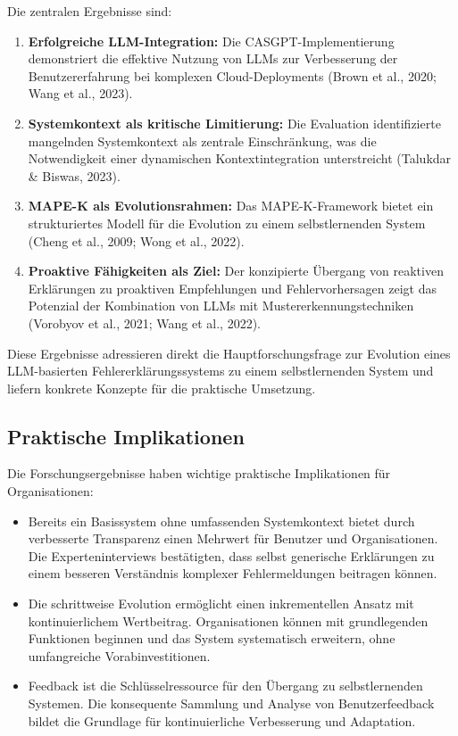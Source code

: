 \documentclass[
  a4paper,
  12pt,
  oneside,
  open=any,
  BCOR=12mm,
  DIV=14,
  parskip=half*,
  headsepline,
  footsepline,
  pointlessnumbers,
  liststotoc,
  numbers=noenddot,
  listof=totoc]{scrartcl}
\providecommand{\tightlist}{%
  \setlength{\itemsep}{0pt}\setlength{\parskip}{0pt}}\usepackage{longtable,booktabs,array}
\begin{document}
Die zentralen Ergebnisse sind:

\begin{enumerate}
\def\labelenumi{\arabic{enumi}.}
\tightlist
\item
  \textbf{Erfolgreiche LLM-Integration:} Die CASGPT-Implementierung
  demonstriert die effektive Nutzung von LLMs zur Verbesserung der
  Benutzererfahrung bei komplexen Cloud-Deployments (Brown et al., 2020;
  Wang et al., 2023).
\item
  \textbf{Systemkontext als kritische Limitierung:} Die Evaluation
  identifizierte mangelnden Systemkontext als zentrale Einschränkung,
  was die Notwendigkeit einer dynamischen Kontextintegration
  unterstreicht (Talukdar \& Biswas, 2023).
\item
  \textbf{MAPE-K als Evolutionsrahmen:} Das MAPE-K-Framework bietet ein
  strukturiertes Modell für die Evolution zu einem selbstlernenden
  System (Cheng et al., 2009; Wong et al., 2022).
\item
  \textbf{Proaktive Fähigkeiten als Ziel:} Der konzipierte Übergang von
  reaktiven Erklärungen zu proaktiven Empfehlungen und Fehlervorhersagen
  zeigt das Potenzial der Kombination von LLMs mit
  Mustererkennungstechniken (Vorobyov et al., 2021; Wang et al., 2022).
\end{enumerate}

Diese Ergebnisse adressieren direkt die Hauptforschungsfrage zur
Evolution eines LLM-basierten Fehlererklärungssystems zu einem
selbstlernenden System und liefern konkrete Konzepte für die praktische
Umsetzung.

\subsection{Praktische Implikationen}\label{praktische-implikationen}

Die Forschungsergebnisse haben wichtige praktische Implikationen für
Organisationen:

\begin{itemize}
\tightlist
\item
  Bereits ein Basissystem ohne umfassenden Systemkontext bietet durch
  verbesserte Transparenz einen Mehrwert für Benutzer und
  Organisationen. Die Experteninterviews bestätigten, dass selbst
  generische Erklärungen zu einem besseren Verständnis komplexer
  Fehlermeldungen beitragen können.
\item
  Die schrittweise Evolution ermöglicht einen inkrementellen Ansatz mit
  kontinuierlichem Wertbeitrag. Organisationen können mit grundlegenden
  Funktionen beginnen und das System systematisch erweitern, ohne
  umfangreiche Vorabinvestitionen.
\item
  Feedback ist die Schlüsselressource für den Übergang zu
  selbstlernenden Systemen. Die konsequente Sammlung und Analyse von
  Benutzerfeedback bildet die Grundlage für kontinuierliche Verbesserung
  und Adaptation.
\end{itemize}
\end{document}
